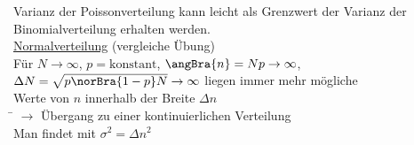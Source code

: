 \begin{tabbing}
Varianz der Poissonverteilung kann leicht als Grenzwert der Varianz der Binomialverteilung erhalten werden.\\
\underline{Normalverteilung} (vergleiche Übung)\\
Für $N\to\infty$, $p=\text{konstant}$, $\angBra{n} = N p \to \infty$, $\Delta N = \sqrt{p\norBra{1-p}N} \to \infty$ liegen immer mehr mögliche\\ Werte von $n$ innerhalb der Breite $\Delta n$\\
\hspace{4em} \= \kill
$\rightarrow$\> Übergang zu einer kontinuierlichen Verteilung\\
Man findet  mit $\sigma^2 = \Delta n^2$
\end{tabbing}


